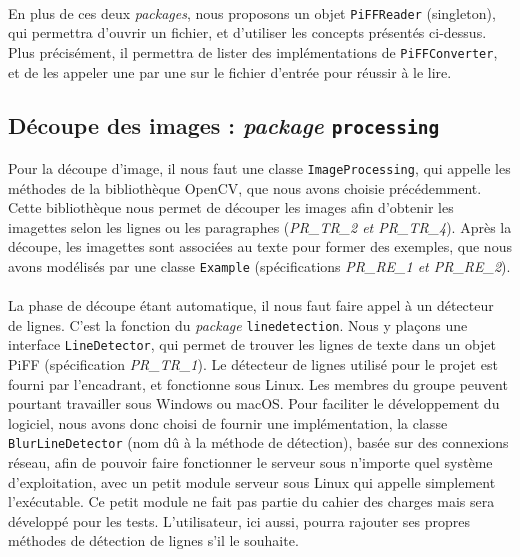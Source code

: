 \paragraph{}
En plus de ces deux \textit{packages}, nous proposons un objet \texttt{PiFFReader} (singleton), qui permettra d'ouvrir un fichier, et d'utiliser les concepts présentés ci-dessus. Plus précisément, il permettra de lister des implémentations de \texttt{PiFFConverter}, et de les appeler une par une sur le fichier d'entrée pour réussir à le lire.

\subsection{Découpe des images : \textit{package} \texttt{processing}}

Pour la découpe d'image, il nous faut une classe \texttt{ImageProcessing}, qui appelle les méthodes de la bibliothèque OpenCV, que nous avons choisie précédemment. Cette bibliothèque nous permet de découper les images afin d'obtenir les imagettes selon les lignes ou les paragraphes (\textit{PR\_TR\_2 et PR\_TR\_4}). Après la découpe, les imagettes sont associées au texte pour former des exemples, que nous avons modélisés par une classe \texttt{Example} (spécifications \textit{PR\_RE\_1 et PR\_RE\_2}). 

\paragraph{}
La phase de découpe étant automatique, il nous faut faire appel à un détecteur de lignes. C'est la fonction du \textit{package} \texttt{linedetection}. Nous y plaçons une interface \texttt{LineDetector}, qui permet de trouver les lignes de texte dans un objet PiFF (spécification \textit{PR\_TR\_1}). Le détecteur de lignes utilisé pour le projet est fourni par l'encadrant, et fonctionne sous Linux. Les membres du groupe peuvent pourtant travailler sous Windows ou macOS. Pour faciliter le développement du logiciel, nous avons donc choisi de fournir une implémentation, la classe \texttt{BlurLineDetector} (nom dû à la méthode de détection), basée sur des connexions réseau, afin de pouvoir faire fonctionner le serveur sous n'importe quel système d'exploitation, avec un petit module serveur sous Linux qui appelle simplement l'exécutable. Ce petit module ne fait pas partie du cahier des charges mais sera développé pour les tests. L'utilisateur, ici aussi, pourra rajouter ses propres méthodes de détection de lignes s'il le souhaite.

